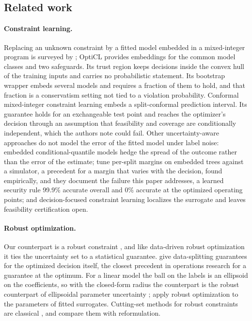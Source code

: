 \subsection{Related work}

\paragraph{Constraint learning.}
Replacing an unknown constraint by a fitted model embedded in a mixed-integer
program is surveyed by \citet{fajemisin2024optimization}; OptiCL
\citep{maragno2025mixed} provides embeddings for the common model classes and
two safeguards. Its trust region keeps decisions inside the convex hull of
the training inputs and carries no probabilistic statement. Its bootstrap
wrapper embeds several models and requires a fraction of them to hold, and
that fraction is a conservatism setting not tied to a violation probability.
Conformal mixed-integer constraint learning \citep{ovalle2025cmicl} embeds a
split-conformal prediction interval. Its guarantee holds for an exchangeable
test point and reaches the optimizer's decision through an assumption that
feasibility and coverage are conditionally independent, which the authors
note could fail. Other uncertainty-aware approaches do not model the error of
the fitted model under label noise: embedded conditional-quantile models
\citep{alcantara2023datadriven} hedge the spread of the outcome rather than
the error of the estimate; \citet{cremer2019datadriven} tune per-split
margins on embedded trees against a simulator, a precedent for a margin that
varies with the decision, found empirically, and they document the failure
this paper addresses, a learned security rule 99.9\% accurate overall and
0\% accurate at the optimized operating points; and decision-focused
constraint learning \citep{oztekin2026dcl} localizes the surrogate and leaves
feasibility certification open.

\paragraph{Robust optimization.}
Our counterpart is a robust constraint
\citep{bertsimas2022robust}, and like data-driven robust optimization
\citep{bertsimas2018datadriven} it ties the uncertainty set to a statistical
guarantee. \citet{hong2021learning} give data-splitting guarantees for the
optimized decision itself, the closest precedent in operations research for
a guarantee at the optimum. For a linear model the ball on the labels is an
ellipsoid on the coefficients, so with the closed-form radius the counterpart
is the robust counterpart of ellipsoidal parameter uncertainty
\citep{goldfarb2003robust}; \citet{hullen2020managing} apply robust
optimization to the parameters of fitted surrogates. Cutting-set methods for
robust constraints are classical \citep{mutapcic2009cutting}, and
\citet{bertsimas2016reformulation} compare them with reformulation.

